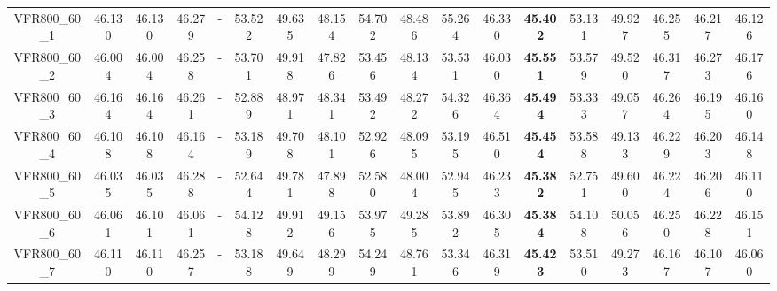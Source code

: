 \begin{tabular}{cc|ccc|ccccccccccccc}
VFR800\_60\_1      & 46.130           & 46.130           & 46.279           & -                & 53.522           & 49.635           & 48.154           & 54.702           & 48.486           & 55.264           & 46.330           & {\bf 45.402}     & 53.131           & 49.927           & 46.255           & 46.217           & 46.126          \\ 
VFR800\_60\_2      & 46.004           & 46.004           & 46.258           & -                & 53.701           & 49.918           & 47.826           & 53.456           & 48.134           & 53.531           & 46.030           & {\bf 45.551}     & 53.579           & 49.520           & 46.317           & 46.273           & 46.176          \\ 
VFR800\_60\_3      & 46.164           & 46.164           & 46.261           & -                & 52.889           & 48.971           & 48.341           & 53.492           & 48.272           & 54.326           & 46.364           & {\bf 45.494}     & 53.333           & 49.057           & 46.264           & 46.195           & 46.160          \\ 
VFR800\_60\_4      & 46.108           & 46.108           & 46.164           & -                & 53.189           & 49.708           & 48.101           & 52.926           & 48.095           & 53.195           & 46.510           & {\bf 45.454}     & 53.588           & 49.133           & 46.229           & 46.203           & 46.148          \\ 
VFR800\_60\_5      & 46.035           & 46.035           & 46.288           & -                & 52.644           & 49.781           & 47.898           & 52.580           & 48.004           & 52.945           & 46.233           & {\bf 45.382}     & 52.751           & 49.600           & 46.224           & 46.206           & 46.110          \\ 
VFR800\_60\_6      & 46.061           & 46.101           & 46.061           & -                & 54.128           & 49.912           & 49.156           & 53.975           & 49.285           & 53.892           & 46.305           & {\bf 45.384}     & 54.108           & 50.056           & 46.250           & 46.228           & 46.151          \\ 
VFR800\_60\_7      & 46.110           & 46.110           & 46.257           & -                & 53.188           & 49.649           & 48.299           & 54.249           & 48.761           & 53.346           & 46.319           & {\bf 45.423}     & 53.510           & 49.273           & 46.167           & 46.107           & 46.060          \\ 

\end{tabular}
